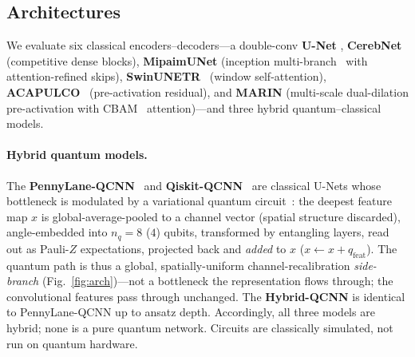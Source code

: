 \documentclass[runningheads]{llncs}
\begin{document}
\subsection{Architectures}
We evaluate six classical encoders--decoders---a double-conv \textbf{U-Net}
\cite{unet,unet3d}, \textbf{CerebNet}~\cite{cerebnet} (competitive dense
blocks), \textbf{MipaimUNet} (inception multi-branch~\cite{inception} with
attention-refined skips), \textbf{SwinUNETR}~\cite{swinunetr,swin} (window
self-attention), \textbf{ACAPULCO}~\cite{acapulco} (pre-activation residual),
and \textbf{MARIN} (multi-scale dual-dilation pre-activation with
CBAM~\cite{cbam} attention)---and three hybrid quantum--classical models.

\paragraph{Hybrid quantum models.} The \textbf{PennyLane-QCNN}~\cite{pennylane}
and \textbf{Qiskit-QCNN}~\cite{qiskit} are classical U-Nets whose bottleneck is
modulated by a variational quantum circuit~\cite{qcnn}: the deepest feature map
$x$ is global-average-pooled to a channel vector (spatial structure discarded),
angle-embedded into $n_q{=}8$ ($4$) qubits, transformed by entangling layers,
read out as Pauli-$Z$ expectations, projected back and \emph{added} to $x$
($x \leftarrow x + q_{\text{feat}}$). The quantum path is thus a global,
spatially-uniform channel-recalibration \emph{side-branch}
(Fig.~\ref{fig:arch})---not a bottleneck the representation flows through; the
convolutional features pass through unchanged. The \textbf{Hybrid-QCNN} is
identical to PennyLane-QCNN up to ansatz depth. Accordingly, all three models
are hybrid; none is a pure quantum network. Circuits are classically simulated,
not run on quantum hardware.
\end{document}
